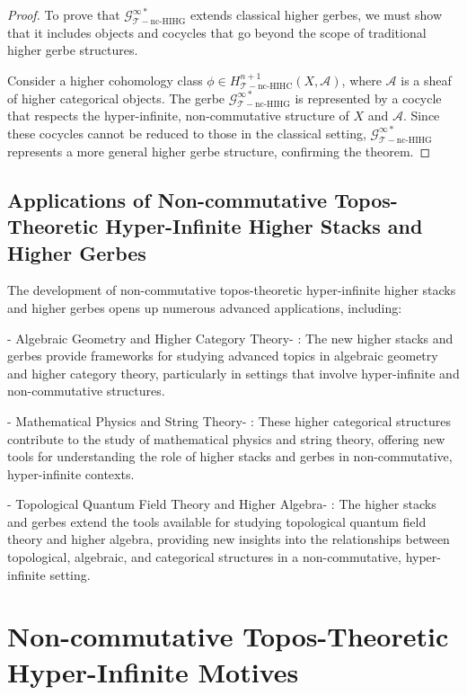\documentclass{article}
\begin{document}
\begin{proof}
To prove that \(\mathcal{G}_{\mathcal{T}-\text{nc-HIHG}}^{\infty *}\) extends classical higher gerbes, we must show that it includes objects and cocycles that go beyond the scope of traditional higher gerbe structures.

Consider a higher cohomology class \(\phi \in H_{\mathcal{T}-\text{nc-HIHC}}^{n+1}(X, \mathcal{A})\), where \(\mathcal{A}\) is a sheaf of higher categorical objects. The gerbe \(\mathcal{G}_{\mathcal{T}-\text{nc-HIHG}}^{\infty *}\) is represented by a cocycle that respects the hyper-infinite, non-commutative structure of \(X\) and \(\mathcal{A}\). Since these cocycles cannot be reduced to those in the classical setting, \(\mathcal{G}_{\mathcal{T}-\text{nc-HIHG}}^{\infty *}\) represents a more general higher gerbe structure, confirming the theorem.
\end{proof}

\subsection{Applications of Non-commutative Topos-Theoretic Hyper-Infinite Higher Stacks and Higher Gerbes}
The development of non-commutative topos-theoretic hyper-infinite higher stacks and higher gerbes opens up numerous advanced applications, including:

-  Algebraic Geometry and Higher Category Theory- : The new higher stacks and gerbes provide frameworks for studying advanced topics in algebraic geometry and higher category theory, particularly in settings that involve hyper-infinite and non-commutative structures.

-  Mathematical Physics and String Theory- : These higher categorical structures contribute to the study of mathematical physics and string theory, offering new tools for understanding the role of higher stacks and gerbes in non-commutative, hyper-infinite contexts.

-  Topological Quantum Field Theory and Higher Algebra- : The higher stacks and gerbes extend the tools available for studying topological quantum field theory and higher algebra, providing new insights into the relationships between topological, algebraic, and categorical structures in a non-commutative, hyper-infinite setting.


\section{Non-commutative Topos-Theoretic Hyper-Infinite Motives}
\end{document}
